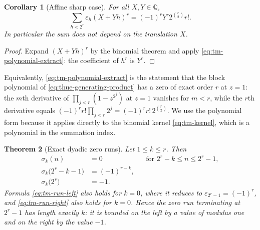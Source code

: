 \documentclass[11pt,oneside]{article}
\newtheorem{theorem}{Theorem}[section]
\newtheorem{corollary}[theorem]{Corollary}
\theoremstyle{definition}
\theoremstyle{remark}
\newcommand{\Q}{\mathbb Q}
\begin{document}
\begin{corollary}[Affine sharp case]
\label{thm:tm-affine-sharp}
For all $X,Y\in\Q$,
\begin{equation*}
 \sum_{h<2^r}\varepsilon_h(X+Yh)^r=(-1)^rY^r2^{\binom r2}r!.
\end{equation*}
In particular the sum does not depend on the translation $X$.
\end{corollary}

\begin{proof}
Expand $(X+Yh)^r$ by the binomial theorem and apply \eqref{eq:tm-polynomial-extract}: the
coefficient of $h^r$ is $Y^r$.
\end{proof}

Equivalently, \eqref{eq:tm-polynomial-extract} is the statement that the block polynomial
of \eqref{eq:thue-generating-product} has a zero of exact order $r$ at $z=1$: the
$m$\/th derivative of $\prod_{j<r}(1-z^{2^j})$ at $z=1$ vanishes for $m<r$, while the
$r$\/th derivative equals $(-1)^r r!\prod_{j<r}2^j=(-1)^rr!\,2^{\binom r2}$.  We use the
polynomial form because it applies directly to the binomial kernel
\eqref{eq:tm-kernel}, which is a polynomial in the summation index.

\begin{theorem}[Exact dyadic zero runs]
\label{thm:tm-zero-run}
Let $1\le k\le r$.  Then
\begin{align}
 \sigma_k(n)&=0 &&\text{for } 2^r-k\le n\le2^r-1,          \label{eq:tm-zero-run}\\
 \sigma_k\bigl(2^r-k-1\bigr)&=(-1)^{r-k},                  \label{eq:tm-run-left}\\
 \sigma_k\bigl(2^r\bigr)&=-1.                              \label{eq:tm-run-right}
\end{align}
Formula \eqref{eq:tm-run-left} also holds for $k=0$, where it reduces to
$\varepsilon_{2^r-1}=(-1)^r$, and \eqref{eq:tm-run-right} also holds for $k=0$.  Hence the
zero run terminating at $2^r-1$ has length exactly $k$: it is bounded on the left by a value
of modulus one and on the right by the value $-1$.
\end{theorem}
\end{document}
